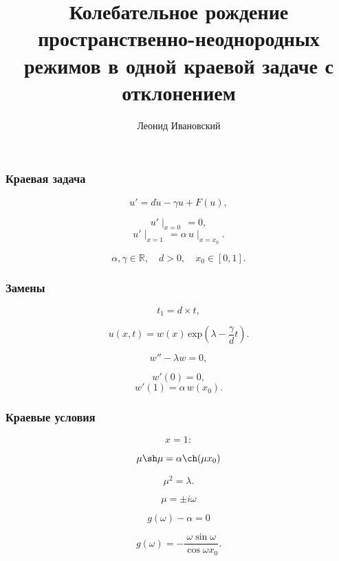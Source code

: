 \documentclass[fullscreen=true, unicode, bookmarks=false]{beamer}
\title[]{ Колебательное рождение пространственно-неоднородных режимов в одной краевой задаче с отклонением }
\author[]{{\large Леонид Ивановский}}
\date{}
\institute[]
\begin{document}
\begin{frame}
\titlepage
\end{frame} 

\begin{frame}
\frametitle{ Краевая задача }
 
\begin{equation}\label{ivanovsky-eq1}
	u' = d \ddot{u} - \gamma u + F(u),
\end{equation}	
	
$$  u'\mid_{x=0} \, = 0, $$
$$ u'\mid_{x=1} \, = \alpha\,u\mid_{x=x_0}. $$

$$ \alpha, \gamma \in \mathbb{R}, \quad d > 0, \quad x_0 \in [0, 1]. $$

\end{frame}

\begin{frame}
\frametitle{ Замены }
	
$$ t_1 = d \times t, $$

\bigskip

$$ u(x, t) = w(x)\,\mbox{exp}\left( \lambda - \frac{\gamma}{d}t \right). $$

\end{frame}

\begin{frame}
	
\begin{equation}\label{ivanovsky-eq2}
	w'' - \lambda w = 0,
\end{equation}

$$ w'(0) = 0, $$
$$ w'(1) = \alpha\,w(x_0). $$

\end{frame}

\begin{frame}
\frametitle{ Краевые условия }
	
$$ x = 1: $$

\bigskip

$$ \mu \sh \mu = \alpha \ch(\mu x_0) $$

\bigskip

$$ \mu^2 = \lambda. $$

\end{frame}

\begin{frame}
	
$$ \mu = \pm i \omega $$

\bigskip

\begin{equation}\label{ivanovsky-eq3}
	g(\omega) - \alpha = 0
\end{equation}

\bigskip

$$ g(\omega) = -\frac{\omega \sin \omega}{\cos \omega x_0}. $$

\end{frame}
\end{document}

